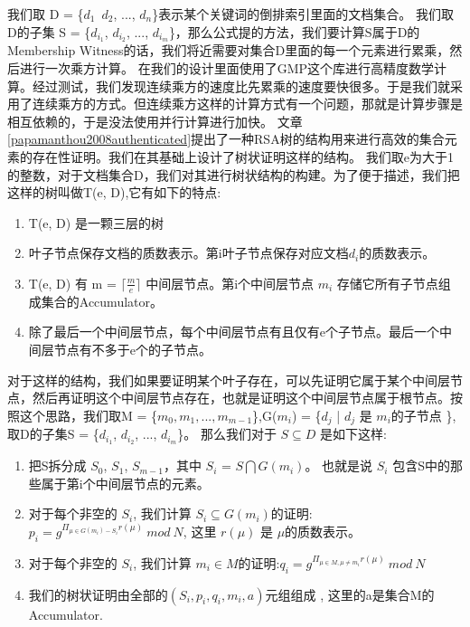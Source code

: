 我们取 D = \{$d_1$\, $d_2$, ..., $d_n$\}表示某个关键词的倒排索引里面的文档集合。
我们取D的子集 S = \{$d_{i_1}$, $d_{i_2}$, ..., $d_{i_m}$\}，那么公式提的方法，我们要计算S属于D的Membership Witness的话，我们将近需要对集合D里面的每一个元素进行累乘，然后进行一次乘方计算。
在我们的设计里面使用了GMP这个库进行高精度数学计算。经过测试，我们发现连续乘方的速度比先累乘的速度要快很多。于是我们就采用了连续乘方的方式。但连续乘方这样的计算方式有一个问题，那就是计算步骤是相互依赖的，于是没法使用并行计算进行加快。
文章\ref{papamanthou2008authenticated}提出了一种RSA树的结构用来进行高效的集合元素的存在性证明。我们在其基础上设计了树状证明这样的结构。
我们取e为大于1的整数，对于文档集合D，我们对其进行树状结构的构建。为了便于描述，我们把这样的树叫做T(e, D),它有如下的特点:
\begin{enumerate}
  \item T(e, D) 是一颗三层的树
  \item 叶子节点保存文档的质数表示。第i叶子节点保存对应文档$d_i$的质数表示。
  \item T(e, D) 有 m = $\lceil \frac{m}{e} \rceil$ 中间层节点。第i个中间层节点 $m_i$ 存储它所有子节点组成集合的Accumulator。
  \item 除了最后一个中间层节点，每个中间层节点有且仅有e个子节点。最后一个中间层节点有不多于e个的子节点。
\end{enumerate}

对于这样的结构，我们如果要证明某个叶子存在，可以先证明它属于某个中间层节点，然后再证明这个中间层节点存在，也就是证明这个中间层节点属于根节点。按照这个思路，我们取M = \{$m_0, m_1, ..., m_{m-1}$\},G($m_i$) = \{$d_j$ | $d_j$ 是 $m_i$的子节点 \}, 取D的子集S = \{$d_{i_1}$, $d_{i_2}$, ..., $d_{i_m}$\}。 那么我们对于 $S \subseteq D$ 是如下这样:
\begin{enumerate}
  \item 把S拆分成 $S_0$, $S_1$, $S_{m-1}$，其中 $S_i$ = $S \bigcap G(m_i)$。 也就是说 $S_i$ 包含S中的那些属于第i个中间层节点的元素。
  \item 对于每个非空的 $S_i$, 我们计算 $S_i \subseteq G(m_i)$的证明: $p_i = g^{\Pi_{\mu \in G(m_i) - S_i} r(\mu)}\ mod\ N$, 这里 $r(\mu)$ 是 $\mu$的质数表示。 
  \item 对于每个非空的 $S_i$, 我们计算 $m_i \in M$的证明:$q_i =  g^{\Pi_{\mu \in M, \mu \ne m_i} r(\mu)}\ mod\ N$
  \item 我们的树状证明由全部的$(S_i, p_i, q_i, m_i, a)$元组组成 , 这里的a是集合M的Accumulator.
\end{enumerate}

